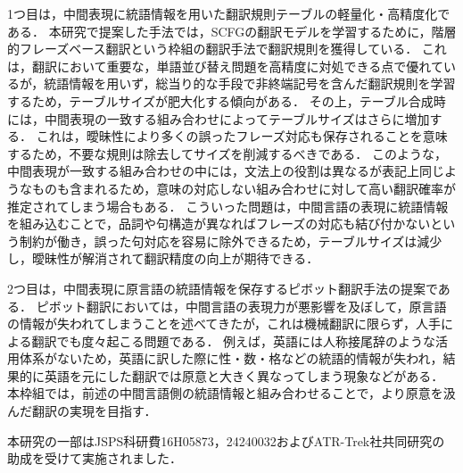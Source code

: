 \documentclass[japanese]{jnlp_1.4}
\begin{document}
1つ目は，中間表現に統語情報を用いた翻訳規則テーブルの軽量化・高精度化である．
本研究で提案した手法では，SCFGの翻訳モデルを学習するために，階層的フレーズベース翻訳という枠組の翻訳手法で翻訳規則を獲得している．
これは，翻訳において重要な，単語並び替え問題を高精度に対処できる点で優れているが，統語情報を用いず，総当り的な手段で非終端記号を含んだ翻訳規則を学習するため，テーブルサイズが肥大化する傾向がある．
その上，テーブル合成時には，中間表現の一致する組み合わせによってテーブルサイズはさらに増加する．
これは，曖昧性により多くの誤ったフレーズ対応も保存されることを意味するため，不要な規則は除去してサイズを削減するべきである．
このような，中間表現が一致する組み合わせの中には，文法上の役割は異なるが表記上同じようなものも含まれるため，意味の対応しない組み合わせに対して高い翻訳確率が推定されてしまう場合もある．
こういった問題は，中間言語の表現に統語情報を組み込むことで，品詞や句構造が異なればフレーズの対応も結び付かないという制約が働き，誤った句対応を容易に除外できるため，テーブルサイズは減少し，曖昧性が解消されて翻訳精度の向上が期待できる．

2つ目は，中間表現に原言語の統語情報を保存するピボット翻訳手法の提案である．
ピボット翻訳においては，中間言語の表現力が悪影響を及ぼして，原言語の情報が失われてしまうことを述べてきたが，これは機械翻訳に限らず，人手による翻訳でも度々起こる問題である．
例えば，英語には人称接尾辞のような活用体系がないため，英語に訳した際に性・数・格などの統語的情報が失われ，結果的に英語を元にした翻訳では原意と大きく異なってしまう現象などがある．
本枠組では，前述の中間言語側の統語情報と組み合わせることで，より原意を汲んだ翻訳の実現を目指す．



\acknowledgment

本研究の一部はJSPS科研費16H05873，24240032およびATR-Trek社共同研究の助成を受けて実施されました．
\end{document}
